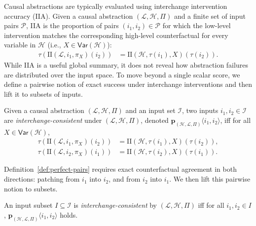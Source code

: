Causal abstractions are typically evaluated using interchange intervention accuracy (IIA). Given a causal abstraction \((\mathcal L,\mathcal H,\Pi)\) and a finite set of input pairs \(\mathcal P\), IIA is the proportion of pairs \((i_1,i_2)\in\mathcal P\) for which the low-level intervention matches the corresponding high-level counterfactual for every variable in \(\mathcal H\) (i.e., \(X\in\mathsf{Var}(\mathcal H)\)):
\begin{align*}
\tau\!\left( \text{II}(\mathcal L,i_1,\pi_X)(i_2)\right)
&=
\text{II}\!\left(\mathcal H,\tau(i_1),X\right)\!\left(\tau(i_2)\right).
\end{align*}
While IIA is a useful global summary, it does not reveal how abstraction failures are distributed over the input space. To move beyond a single scalar score, we define a pairwise notion of exact success under interchange interventions and then lift it to subsets of inputs.
\begin{definition}
\label{def:perfect-pairs}
Given a causal abstraction \((\mathcal L,\mathcal H,\Pi)\) and an input set \(\mathcal I\), two inputs \(i_1,i_2\in\mathcal I\) are \emph{interchange-consistent} under \((\mathcal L,\mathcal H,\Pi)\), denoted \(\mathbf p_{(\mathcal H,\mathcal L,\Pi)}\langle i_1,i_2\rangle\), iff for all \(X\in\mathsf{Var}(\mathcal H)\),
\begin{equation*}\label{eq:perfect}
\begin{split}
\tau\!\left( \text{II}(\mathcal L,i_1,\pi_X)(i_2)\right)
&=
\text{II}\left(\mathcal H,\tau(i_1),X\right)\!\left(\tau(i_2)\right),\\
\tau\!\left( \text{II}(\mathcal L,i_2,\pi_X)(i_1)\right)
&=
\text{II}\left(\mathcal H,\tau(i_2),X\right)\left(\tau(i_1)\right).
\end{split}
\end{equation*}
\end{definition}

Definition~\ref{def:perfect-pairs} requires exact counterfactual agreement in both directions: patching from \(i_1\) into \(i_2\), and from \(i_2\) into \(i_1\). We then lift this pairwise notion to subsets.

\begin{definition}
\label{def:perfect-subspace-method}
An input subset \(I \subseteq \mathcal I\) is \emph{interchange-consistent} by \((\mathcal L,\mathcal H,\Pi)\) iff for all \(i_1,i_2\in I\), \(\mathbf p_{(\mathcal H,\mathcal L,\Pi)}\langle i_1,i_2\rangle\) holds.
\end{definition}

